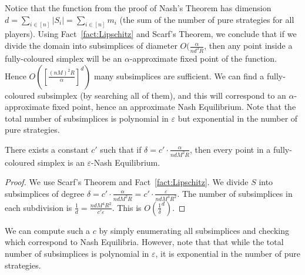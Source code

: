 Notice that the function from the proof of Nash's Theorem has dimension $d =
\sum_{i \in [n]} |S_i| = \sum_{i \in [n]} m_i$ (the sum of the number of pure
strategies for all players). Using Fact~\ref{fact:Lipschitz} and Scarf's
Theorem, we conclude that if we divide the domain into subsimplices of diameter
$O(\frac{\alpha}{nd^3R}$, then any point inside a fully-coloured simplex will
be an $\alpha$-approximate fixed point of the function. Hence $O([ \frac{(nM)^2
R}{\alpha} ]^d)$ many subsimplices are sufficient. We can find a fully-coloured
subsimplex (by searching all of them), and this will correspond to an
$\alpha$-approximate fixed point, hence an approximate Nash Equilibrium. Note
that the total number of subsimplices is polynomial in $\varepsilon$ but
exponential in the number of pure strategies.

\begin{corollary}
	There exists a constant $c'$ such that if $\delta = c' \cdot
	\frac{\alpha}{ndM^2R}$, then every point in a fully-coloured simplex is
	an $\varepsilon$-Nash Equilibrium.
\end{corollary}
\begin{proof}
	We use Scarf's Theorem and Fact~\ref{fact:Lipschitz}. We divide $S$ into
	subsimplices of degree $\delta = c' \cdot \frac{\alpha}{ndM^2R} = c' \cdot
	\frac{\varepsilon}{ndM^4R^2}$. The number of subsimplices in each
	subdivision is $\frac{1}{d} = \frac{ndM^4R^2}{c' \varepsilon}$. This is
	$O(\frac{1}{\delta}^d)$.
\end{proof}

We can compute such a $c$ by simply enumerating all subsimplices and checking
which correspond to Nash Equilibria. However, note that that while the total
number of subsimplices is polynomial in $\varepsilon$, it is exponential in the
number of pure strategies.
